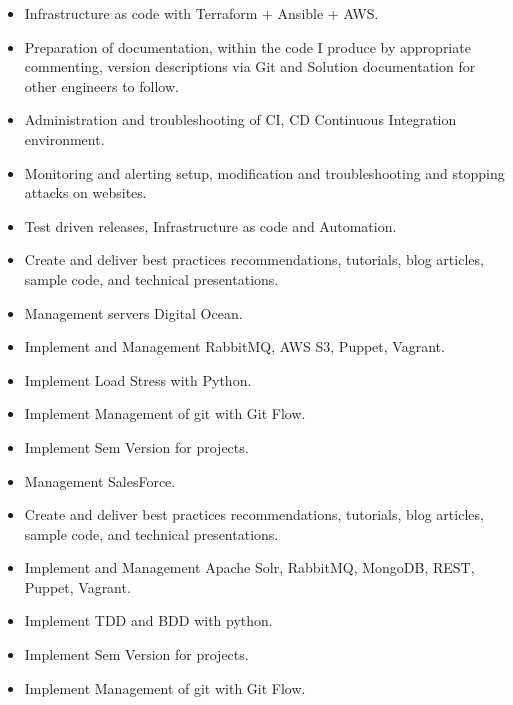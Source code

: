 \divider

\begin{itemize}
    \item Infrastructure as code with Terraform + Ansible + AWS.
    \item Preparation of documentation, within the code I produce by appropriate commenting, version descriptions via Git and Solution documentation for other engineers to follow.
    \item Administration and troubleshooting of CI, CD Continuous Integration environment.
    \item Monitoring and alerting setup, modification and troubleshooting and stopping attacks on websites.
    \item Test driven releases, Infrastructure as code and Automation.
\end{itemize}

\divider

\begin{itemize}
    \item Create and deliver best practices recommendations, tutorials, blog articles, sample code, and technical presentations.
    \item Management servers Digital Ocean.
    \item Implement and Management RabbitMQ, AWS S3, Puppet, Vagrant.
    \item Implement Load Stress with Python.
    \item Implement Management of git with Git Flow.
    \item Implement Sem Version for projects.
    \item Management SalesForce.
\end{itemize}

\divider

\begin{itemize}
    \item Create and deliver best practices recommendations, tutorials, blog articles, sample code, and technical presentations.
    \item Implement and Management Apache Solr, RabbitMQ, MongoDB, REST, Puppet, Vagrant.
    \item Implement TDD and BDD with python.
    \item Implement Sem Version for projects.
    \item Implement Management of git with Git Flow.
\end{itemize}